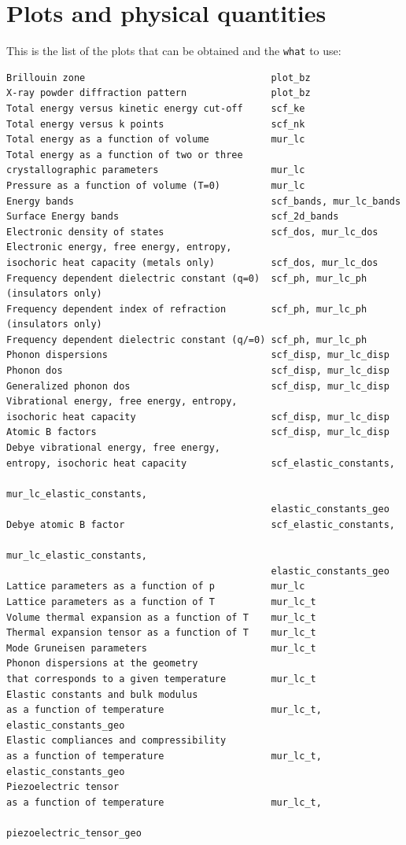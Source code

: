 \documentclass[12pt,a4paper,twoside]{report}
\begin{document}
\newpage
{\color{dark-blue}\chapter{Plots and physical quantities}}
\color{black}
This is the list of the plots that can be obtained and 
the \texttt{what} to use:

\begin{footnotesize}
\begin{verbatim}
Brillouin zone                                 plot_bz
X-ray powder diffraction pattern               plot_bz
Total energy versus kinetic energy cut-off     scf_ke
Total energy versus k points                   scf_nk
Total energy as a function of volume           mur_lc
Total energy as a function of two or three
crystallographic parameters                    mur_lc
Pressure as a function of volume (T=0)         mur_lc
Energy bands                                   scf_bands, mur_lc_bands
Surface Energy bands                           scf_2d_bands
Electronic density of states                   scf_dos, mur_lc_dos
Electronic energy, free energy, entropy,      
isochoric heat capacity (metals only)          scf_dos, mur_lc_dos
Frequency dependent dielectric constant (q=0)  scf_ph, mur_lc_ph
(insulators only)
Frequency dependent index of refraction        scf_ph, mur_lc_ph
(insulators only)
Frequency dependent dielectric constant (q/=0) scf_ph, mur_lc_ph
Phonon dispersions                             scf_disp, mur_lc_disp
Phonon dos                                     scf_disp, mur_lc_disp
Generalized phonon dos                         scf_disp, mur_lc_disp
Vibrational energy, free energy, entropy,      
isochoric heat capacity                        scf_disp, mur_lc_disp
Atomic B factors                               scf_disp, mur_lc_disp
Debye vibrational energy, free energy, 
entropy, isochoric heat capacity               scf_elastic_constants, 
                                               mur_lc_elastic_constants,
                                               elastic_constants_geo
Debye atomic B factor                          scf_elastic_constants,
                                               mur_lc_elastic_constants,
                                               elastic_constants_geo
Lattice parameters as a function of p          mur_lc
Lattice parameters as a function of T          mur_lc_t
Volume thermal expansion as a function of T    mur_lc_t 
Thermal expansion tensor as a function of T    mur_lc_t 
Mode Gruneisen parameters                      mur_lc_t
Phonon dispersions at the geometry 
that corresponds to a given temperature        mur_lc_t
Elastic constants and bulk modulus
as a function of temperature                   mur_lc_t, elastic_constants_geo
Elastic compliances and compressibility
as a function of temperature                   mur_lc_t, elastic_constants_geo
Piezoelectric tensor
as a function of temperature                   mur_lc_t, 
                                               piezoelectric_tensor_geo


\end{verbatim}
\end{footnotesize}
\end{document}

